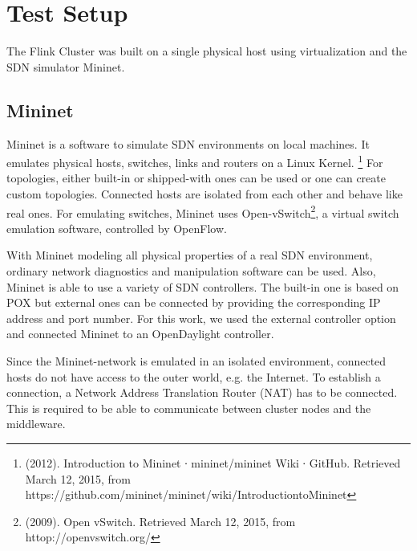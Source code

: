 \section{Test Setup}
The Flink Cluster was built on a single physical host using virtualization and the SDN simulator
Mininet.

\subsection{Mininet}
Mininet is a software to simulate SDN environments on local machines. It  emulates physical hosts,
switches, links and routers on a Linux Kernel. \footnote{(2012). Introduction to Mininet ∙
mininet/mininet Wiki ∙ GitHub. Retrieved March 12, 2015, from
https://github.com/mininet/mininet/wiki/Introduction­to­Mininet} For topologies, either built-in or
shipped-with ones can be used or one can create custom topologies. Connected hosts are isolated from
each other and behave like real ones. For emulating switches, Mininet uses
Open-vSwitch\footnote{(2009). Open vSwitch. Retrieved March 12, 2015, from
httop://openvswitch.org/}, a virtual switch emulation software, controlled by OpenFlow.

With Mininet modeling all physical properties of a real SDN environment, ordinary network
diagnostics and manipulation software can be used. Also, Mininet is able to use a variety of SDN
controllers. The built-in one is based on POX but external ones can be connected by providing the
corresponding IP address and port number. For this work, we used the external controller option and
connected Mininet to an OpenDaylight controller.

Since the Mininet-network is emulated in an isolated environment, connected hosts do not have access
to the outer world, e.g. the Internet. To establish a connection, a Network Address Translation
Router (NAT) has to be connected. This is required to be able to communicate between cluster nodes
and the middleware.

